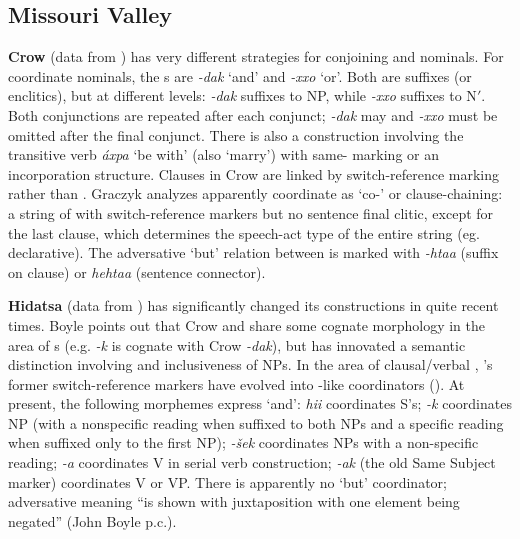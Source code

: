 \documentclass[output=paper]{LSP/langsci}
\begin{document}
\subsection{Missouri Valley}
 
\textbf{Crow} (data from \citealt{Graczyk2007}) has very different strategies for conjoining  and
nominals. For coordinate nominals, the s are \textit{-dak} `and' and \textit{-xxo} `or'. Both are suffixes (or enclitics), but at different levels: \textit{-dak} suffixes to NP, while \textit{-xxo} suffixes to N$'$. Both conjunctions are repeated after each conjunct; \textit{-dak} may and \textit{-xxo} must be omitted after the final conjunct. There is also a  construction involving the transitive verb \textit{áxpa} `be with' (also `marry') with same- marking or an incorporation structure. Clauses in Crow are linked by switch-reference marking rather than . Graczyk analyzes apparently coordinate  as `co-' or clause-chaining: a string of  with switch-reference markers but no sentence final clitic, except for the last clause, which determines the speech-act type of the entire string (eg. declarative). The adversative `but' relation between  is marked with \textit{-htaa} (suffix on clause) or \textit{hehtaa} (sentence connector).

\textbf{Hidatsa} (data from \citealt{Boyle2005,Boyle2007,Boyle2011}) has significantly changed its  constructions in quite recent times. Boyle points out that Crow and  share some cognate morphology in the area of s (e.g.  \textit{-k} is cognate with Crow \textit{-dak}), but  has innovated a semantic distinction involving  and inclusiveness of NPs. In the area of clausal/verbal , 's former switch-reference markers have evolved into -like coordinators (\citealt{Boyle2011}). At present, the following morphemes express `and': \textit{hii} coordinates S's; \textit{-k} coordinates NP (with a nonspecific reading when suffixed to both NPs and a specific reading when suffixed only to the first NP); \textit{-\v{s}ek} coordinates NPs with a non-specific reading; \textit{-a} coordinates V in serial verb construction; \textit{-ak} (the old Same Subject marker) coordinates V or VP. There is apparently no `but' coordinator; adversative meaning ``is shown with juxtaposition with one element being negated'' (John Boyle p.c.).
\end{document}
